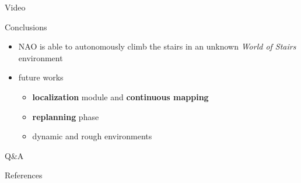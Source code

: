 \documentclass[10pt]{beamer}
\begin{document}
\begin{frame}[standout]
  Video
\end{frame}

\begin{frame}{Conclusions}
  \begin{itemize}
		\item NAO is able to autonomously climb the stairs in an unknown
				\textit{World of Stairs} environment
    \item future works
    \begin{itemize}
      \item \textbf{localization} module and \textbf{continuous mapping}
		  \item \textbf{replanning} phase
		  \item dynamic and rough environments
    \end{itemize}
	\end{itemize}
\end{frame}

\begin{frame}[standout]
    Q\&A
\end{frame}

\appendix

\begin{frame}{References}
  
  
\end{frame}
\end{document}
